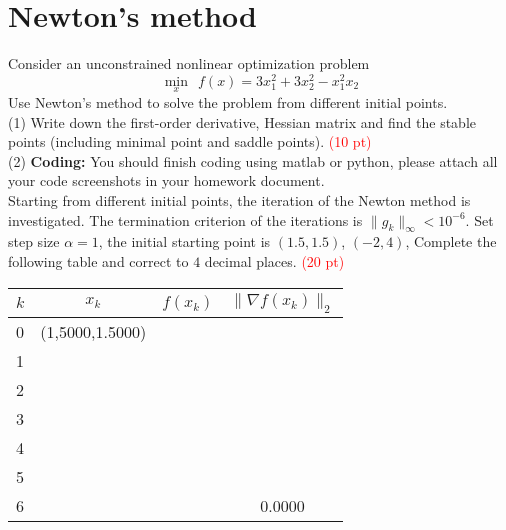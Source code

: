 \documentclass[8pt]{article}
\begin{document}
\section{Newton's method}
Consider an unconstrained nonlinear optimization problem
\begin{equation*}
    \min\limits_x~~f(x)=3x_1^2+3x_2^2-x_1^2x_2
\end{equation*}
Use Newton's method to solve the problem from different initial points.\\
(1) Write down the first-order derivative, Hessian matrix and find the stable points (including minimal point and saddle points).  \textcolor{red}{(10 pt)}\\
(2) \textbf{Coding:}
You should finish coding using matlab or python, please attach all your code screenshots in your homework document.\\
Starting from different initial points, the iteration of the Newton method is investigated. The termination criterion of the iterations is $\|g_k\|_{\infty}<10^{-6}$. Set step size $\alpha=1$, the initial starting point is $(1.5,1.5)$, $(-2,4)$, Complete the following table and correct to $4$ decimal places. \textcolor{red}{(20 pt)}

\begin{table}[h]
\centering
\begin{tabular}{l|c|c|c}
\hline
$k$ &     $x_{k}$       & $f(x_k)$  & $\|\nabla f(x_k)\|_2$ \\ \hline
0 & (1,5000,1.5000)  &        &             \\
1 &                   &        &             \\
2 &                   &        &             \\
3 &                   &        &              \\
4 &                   &        &             \\
5 &                   &        &             \\
6 &                   &        &    0.0000    \\ \hline
\end{tabular}
\end{table}
\end{document}
